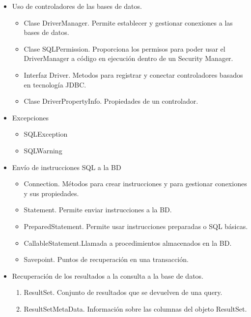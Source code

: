 \documentclass[a4paper,12pt]{article}
\begin{document}
\begin{itemize}
 \item Uso de controladores de las bases de datos.
 \begin{itemize}
  \item Clase DriverManager. Permite establecer y gestionar conexiones a las bases de datos.
  \item Clase SQLPermission. Proporciona los permisos para poder usar el DriverManager a código en ejecución dentro de un Security Manager.
  \item Interfaz Driver. Metodos para registrar y conectar controladores basados en tecnología JDBC.
  \item Clase DriverPropertyInfo. Propiedades de un controlador.
 \end{itemize}
 
 \item Excepciones
 \begin{itemize}
  \item SQLException
  \item SQLWarning
 \end{itemize}
 
 \item Envío de instrucciones SQL a la BD
 \begin{itemize}
  \item Connection. Métodos para crear instrucciones y para gestionar conexiones y sus propiedades.
  \item Statement. Permite enviar instrucciones a la BD.
  \item PreparedStatement. Permite usar instrucciones preparadas o SQL básicas.
  \item CallableStatement.Llamada a procedimientos almacenados en la BD.
  \item Savepoint. Puntos de recuperación en una transacción.
 \end{itemize}
 
 \item Recuperación de los resultados a la consulta a la base de datos.
 \begin{enumerate}
  \item ResultSet. Conjunto de resultados que se devuelven de una query.
  \item ResultSetMetaData. Información sobre las columnas del objeto ResultSet.
 \end{enumerate}

\end{itemize}
\end{document}
